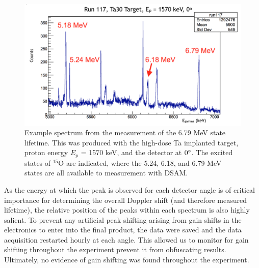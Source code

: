 \begin{figure}
\includegraphics[width=\linewidth]{figures/lifetimeSpectrum.png}
\caption{Example spectrum from the measurement of the 6.79 MeV state lifetime. This was produced with the high-dose Ta implanted target, proton energy $E_{p}$ = 1570 keV, and the detector at $0\degree$. The excited states of $^{15}$O are indicated, where the 5.24, 6.18, and 6.79 MeV states are all available to measurement with DSAM.  }
\label{fig: lifetimeSpec}
\end{figure}

As the energy at which the peak is observed for each detector angle is of critical importance for determining the overall Doppler shift (and therefore measured lifetime), the relative position of the peaks within each spectrum is also highly salient. To prevent any artificial peak shifting arising from gain shifts in the electronics to enter into the final product, the data were saved and the data acquisition restarted hourly at each angle. This allowed us to monitor for gain shifting throughout the experiment prevent it from obfuscating results. Ultimately, no evidence of gain shifting was found throughout the experiment. 

